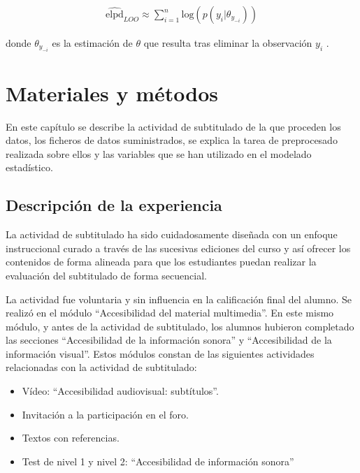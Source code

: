 \documentclass[
  12pt,
  a4paper,
  extrafontsizes,
  onecolumn,
  openright,
  table]{memoir}
\providecommand{\tightlist}{%
  \setlength{\itemsep}{0pt}\setlength{\parskip}{0pt}}\usepackage{longtable,booktabs,array}
\begin{document}
\[
\begin{aligned}
\widehat{\mathrm{elpd}}_{LOO} \approx \sum_{i=1}^{n} \mathrm{log} (p(y_{i} | \theta_{y_{-i}}))
\end{aligned}
\]

donde \(\theta_{y_{-i}}\) es la estimación de \(\theta\) que resulta
tras eliminar la observación \(y_{i}\) \autocite[ver][
pp.~175-176]{gelman2013}.


\hypertarget{sec-metodo}{%
\chapter{Materiales y métodos}\label{sec-metodo}}

En este capítulo se describe la actividad de subtitulado de la que
proceden los datos, los ficheros de datos suministrados, se explica la
tarea de preprocesado realizada sobre ellos y las variables que se han
utilizado en el modelado estadístico.

\hypertarget{sec-desc}{%
\section{Descripción de la experiencia}\label{sec-desc}}

La actividad de subtitulado ha sido cuidadosamente diseñada con un
enfoque instruccional curado a través de las sucesivas ediciones del
curso y así ofrecer los contenidos de forma alineada para que los
estudiantes puedan realizar la evaluación del subtitulado de forma
secuencial.

La actividad fue voluntaria y sin influencia en la calificación final
del alumno. Se realizó en el módulo \enquote{Accesibilidad del material
multimedia}. En este mismo módulo, y antes de la actividad de
subtitulado, los alumnos hubieron completado las secciones
\enquote{Accesibilidad de la información sonora} y
\enquote{Accesibilidad de la información visual}. Estos módulos constan
de las siguientes actividades relacionadas con la actividad de
subtitulado:

\begin{itemize}
\tightlist
\item
  Vídeo: \enquote{Accesibilidad audiovisual: subtítulos}.
\item
  Invitación a la participación en el foro.
\item
  Textos con referencias.
\item
  Test de nivel 1 y nivel 2: \enquote{Accesibilidad de información
  sonora}
\end{itemize}
\end{document}
